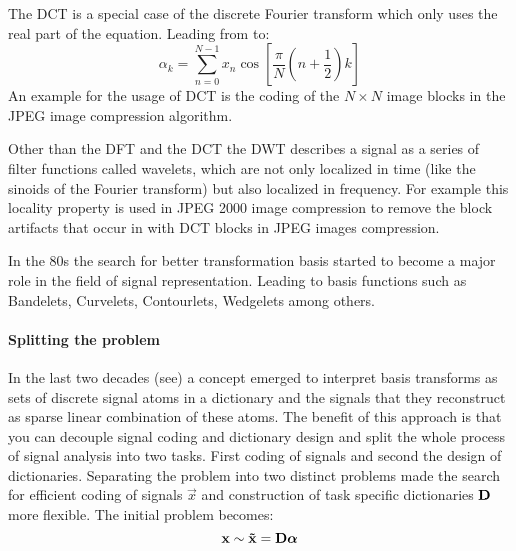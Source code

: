 The DCT is a special case of the discrete Fourier transform which only uses the
real part of the equation. Leading from  to:
\begin{equation*}
\alpha_k = \sum_{n=0}^{N-1}x_n\cos \left[ \frac{\pi}{N} \left(
n+\frac{1}{2}\right) k\right]
\end{equation*}
An example for the usage of DCT is the coding of the $N\times N$ image blocks in
the JPEG image compression algorithm.

Other than the DFT and the DCT the DWT describes a signal as a series of
filter functions called wavelets, which are not only localized in time (like the
sinoids of the Fourier transform) but also localized in frequency. 
For example this locality property is used in JPEG 2000 image compression to
remove the block artifacts that occur in with DCT blocks in JPEG images
compression. 

In the 80s the search for better transformation basis started to become a major
role in the field of signal representation. Leading to basis functions such as
Bandelets, Curvelets, Contourlets, Wedgelets among others.

\paragraph{Splitting the problem}
In the last two decades (see\cite{Olshausen1996,Mallat1993}) a concept emerged
to interpret basis transforms as sets of discrete signal atoms in a dictionary
and the signals that they reconstruct as sparse linear combination of these
atoms. The benefit of this approach is that you can decouple signal coding and
dictionary design and split the whole process of signal analysis into two tasks.
First coding of signals and second the design of dictionaries. Separating the
problem into two distinct problems made the search for efficient coding of
signals $\vec{x}$ and construction of task specific dictionaries $\boldsymbol{\mathrm{D}}$ more
flexible. The initial problem becomes:
\begin{equation}
 \boldsymbol{\mathrm{x}} \sim \boldsymbol{\mathrm{\tilde{x}}}  = \boldsymbol{\mathrm{D}}\boldsymbol{\mathrm{\alpha}}\label{eq:dft}
\end{equation}

